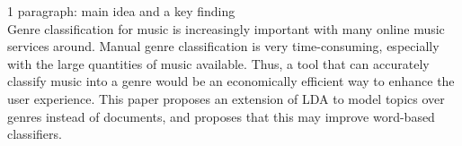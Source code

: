 1 paragraph: main idea and a key finding \\
Genre classification for music is increasingly important with many online music services around. Manual genre classification is very time-consuming, especially with the large quantities of music available. Thus, a tool that can accurately classify music into a genre would be an economically efficient way to enhance the user experience. This paper proposes an extension of LDA to model topics over genres instead of documents, and proposes that this may improve word-based classifiers.